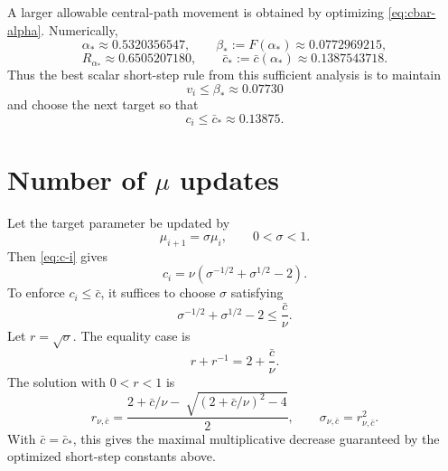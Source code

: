 \documentclass[11pt]{article}
\begin{document}
A larger allowable central-path movement is obtained by optimizing \eqref{eq:cbar-alpha}.  Numerically,
\begin{equation}
  \alpha_*\approx 0.5320356547,
  \qquad
  \beta_*:=F(\alpha_*)\approx 0.0772969215,
\end{equation}
\begin{equation}
  R_{\alpha_*}\approx 0.6505207180,
  \qquad
  \bar c_*:=\bar c(\alpha_*)\approx 0.1387543718.          \label{eq:cstar}
\end{equation}
Thus the best scalar short-step rule from this sufficient analysis is to maintain
\begin{equation}
  v_i\le\beta_*\approx0.07730
\end{equation}
and choose the next target so that
\begin{equation}
  c_i\le \bar c_*\approx0.13875.                         \label{eq:c-star-rule}
\end{equation}

\section{Number of $\mu$ updates}

Let the target parameter be updated by
\begin{equation}
  \mu_{i+1}=\sigma\mu_i,
  \qquad 0<\sigma<1.
\end{equation}
Then \eqref{eq:c-i} gives
\begin{equation}
  c_i=\nu\left(\sigma^{-1/2}+\sigma^{1/2}-2\right).      \label{eq:c-sigma-repeat}
\end{equation}
To enforce $c_i\le \bar c$, it suffices to choose $\sigma$ satisfying
\begin{equation}
  \sigma^{-1/2}+\sigma^{1/2}-2\le \frac{\bar c}{\nu}.     \label{eq:sigma-condition}
\end{equation}
Let $r=\sqrt\sigma$.  The equality case is
\begin{equation}
  r+r^{-1}=2+\frac{\bar c}{\nu}.
\end{equation}
The solution with $0<r<1$ is
\begin{equation}
  r_{\nu,\bar c}
  =\frac{2+\bar c/\nu-\
  \sqrt{(2+\bar c/\nu)^2-4}}{2},
  \qquad
  \sigma_{\nu,\bar c}=r_{\nu,\bar c}^2.                 \label{eq:sigma-exact}
\end{equation}
With $\bar c=\bar c_*$, this gives the maximal multiplicative decrease guaranteed by the optimized short-step constants above.
\end{document}
